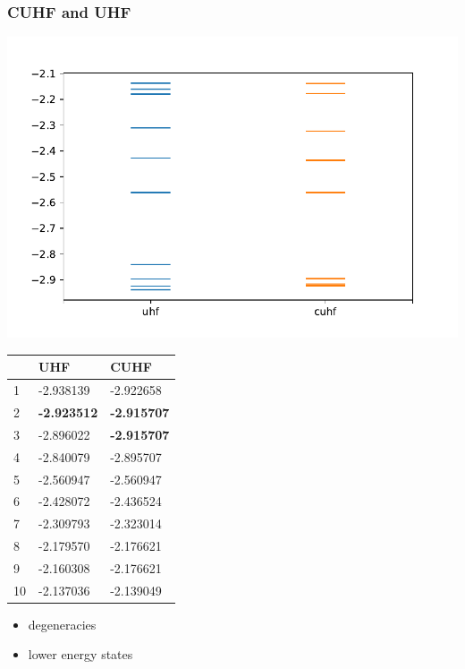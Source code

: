 \documentclass[aspectratio=169]{beamer}
\begin{document}
\begin{frame}
    \frametitle{CUHF and UHF}
    \begin{minipage}[b]{0.6\linewidth}
        \includegraphics[width=\linewidth]{./figures/h3_cis.pdf}
    \end{minipage}
    \begin{minipage}[b]{0.3\linewidth}
        \begin{table}[h]
            \label{tab:excits}
            \begin{tabular}{l|l|l}
                 & UHF       & CUHF      \\
              \hline
              1  & -2.938139 & -2.922658 \\
              2  &  {\color{ugent-re}   \textbf{-2.923512}} & {\color{ugent-re}   \textbf{-2.915707}} \\
              3  & -2.896022 & {\color{ugent-re}   \textbf{-2.915707}} \\
              4  & -2.840079 & -2.895707 \\
              5  & -2.560947 & -2.560947 \\
              6  & -2.428072 & -2.436524 \\
              7  & -2.309793 & -2.323014 \\
              8  & -2.179570 & -2.176621 \\
              9  & -2.160308 & -2.176621 \\
              10 & -2.137036 & -2.139049
            \end{tabular}
          \end{table}
    \end{minipage}
    \begin{itemize}
        \item degeneracies
        \item lower energy states
    \end{itemize}
\end{frame}
\end{document}
